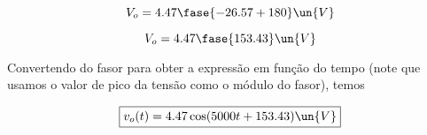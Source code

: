 \[ V_o = 4.47\fase{-26.57 + 180} \un{V} \]

\[ V_o = 4.47\fase{153.43} \un{V} \]

Convertendo do fasor para obter a expressão em função do tempo (note que usamos o valor de pico da tensão como o módulo do fasor),
temos

\[ \boxed{v_o(t) = 4.47\cos(5000t + 153.43) \un{V}}  \]











    























